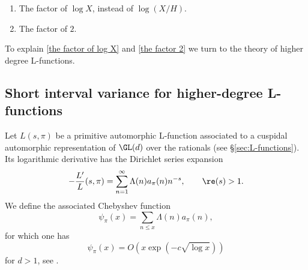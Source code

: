 \documentclass[12pt]{amsart}
\begin{document}
\bigskip

\begin{enumerate}[label=(\Alph*), ref=\Alph*, itemsep=1em]
\item \label{the factor of log X}
The factor of $\log X$, instead of $\log(X/H)$. 

\item \label{the factor 2}
The factor of $2$. 
\end{enumerate}

\bigskip

To explain \eqref{the factor of log X} and \eqref{the factor 2} we turn to the theory of higher degree L-functions. 

\subsection{Short interval variance for higher-degree L-functions}\label{sec:short int for L fns}

Let $L(s,\pi)$ be a primitive automorphic L-function associated
to a cuspidal automorphic representation of $\GL(d)$ over the
rationals (see \S\ref{sec:L-functions}). Its logarithmic derivative has the Dirichlet
series expansion
\[
-\frac{L'}{L}(s,\pi)
=
\sum_{n=1}^{\infty}\Lambda(n)a_\pi(n)n^{-s},
\qquad
\re(s)>1.
\]
We define the associated Chebyshev function
\[
\psi_\pi(x)
=
\sum_{n\le x}\Lambda(n)a_\pi(n),
\]
for which one has
\[
\psi_\pi(x)
=
O\!\left(
x\exp(-c\sqrt{\log x})
\right)
\]
for $d>1$, see \cite[Theorem 2.3]{LiuYe}.


 
\end{document}
